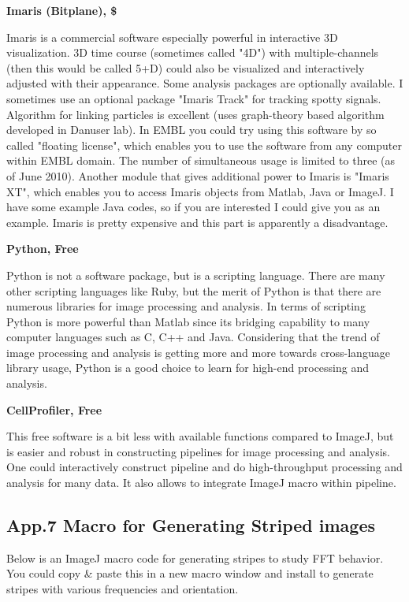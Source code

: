 \textbf{Imaris (Bitplane), \$}


Imaris is a commercial software especially powerful in interactive
3D visualization. 3D time course (sometimes called
"4D") with multiple-channels (then
this would be called 5+D) could also be visualized and interactively
adjusted with their appearance. Some analysis packages are optionally
available. I sometimes use an optional package "Imaris
Track" for tracking spotty signals. Algorithm for
linking particles is excellent (uses graph-theory based algorithm
developed in Danuser lab). In EMBL you could try using this software
by so called "floating license", which enables you to use the software from any computer within EMBL domain. The number of simultaneous usage is limited to three (as of June 2010). Another module that gives additional power to Imaris is
"Imaris XT", which enables you to
access Imaris objects from Matlab, Java or ImageJ. I have some
example Java codes, so if you are interested I could give you as an
example. Imaris is pretty expensive and this part is apparently a disadvantage. 


\textbf{Python, Free}

Python is not a software package, but is a scripting language. There are
many other scripting languages like Ruby, but the merit of Python is
that there are numerous libraries for image processing and analysis. In
terms of scripting Python is more powerful than
Matlab since its bridging capability to many computer languages such
as C, C++ and Java. Considering that the trend of
image processing and analysis is getting more and more towards
cross-language library usage, Python is a good choice to learn for
high-end processing and analysis.

\textbf{CellProfiler, Free}

This free software is a bit less with available functions compared to
ImageJ, but is easier and robust in constructing pipelines for image
processing and analysis. One could interactively construct pipeline and
do high-throughput processing and analysis for many data. It also allows to integrate ImageJ macro within pipeline. 

\clearpage
\subsection{App.7 Macro for Generating Striped images}
\label{app7}

Below is an ImageJ macro code for generating stripes to study FFT behavior. You could copy \& paste this in a new macro window
and install to generate stripes with various frequencies and orientation.  


